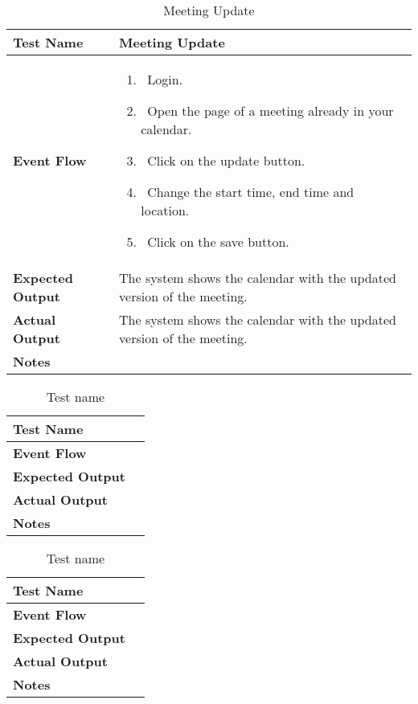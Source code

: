\begin{table}[h]	
\centering
\def\arraystretch{1.5}
\begin{tabular}{|m{7cm}|m{7cm}|}
	\hline
	\textbf{Test Name}            &  Meeting Update  \\ \hline
	\textbf{Event Flow}             & 
		\begin{enumerate}
			\item~Login.
			\item~Open the page of a meeting already in your calendar.
			\item~Click on the update button.
			\item~Change the start time, end time and location.
			\item~Click on the save button.
		\end{enumerate}
	\\ \hline
	\textbf{Expected Output}  &  The system shows the calendar with the updated version of the meeting.   \\ \hline
	\textbf{Actual Output}       &  The system shows the calendar with the updated version of the meeting.   \\ \hline
	\textbf{Notes} & \\ \hline
\end{tabular}
\caption{Meeting Update}
\end{table}


\begin{table}[h]	
\centering
\def\arraystretch{1.5}
\begin{tabular}{|m{7cm}|m{7cm}|}
	\hline
	\textbf{Test Name}            &    \\ \hline
	\textbf{Event Flow}             &   \\ \hline
	\textbf{Expected Output}  &     \\ \hline
	\textbf{Actual Output}       &     \\ \hline
	\textbf{Notes} & \\ \hline
\end{tabular}
\caption{Test name}
\end{table}


\begin{table}[h]	
\centering
\def\arraystretch{1.5}
\begin{tabular}{|m{7cm}|m{7cm}|}
	\hline
	\textbf{Test Name}            &    \\ \hline
	\textbf{Event Flow}             &   \\ \hline
	\textbf{Expected Output}  &     \\ \hline
	\textbf{Actual Output}       &     \\ \hline
	\textbf{Notes} & \\ \hline
\end{tabular}
\caption{Test name}
\end{table}


